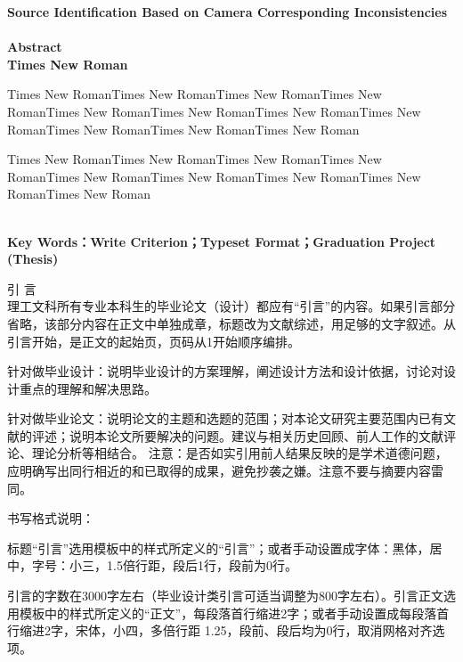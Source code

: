 \documentclass{ctexart}%
\newenvironment{abstract1}[0]{}{}%
{}
\begin{document}
	\begin{abstract1}
	\setmainfont{Times New Roman}  \bfseries \center \linespread{1.25} Source Identification Based on Camera Corresponding Inconsistencies\\
	\heiti {} ~\\
	\setmainfont{Times New Roman}  \center \linespread{1.5} Abstract\\
	\vspace{11pt}
	\setlength{\parindent}{24pt}
	\setmainfont{Times New Roman}  \justifying \linespread{1.25} Times New Roman\par
	Times New RomanTimes New RomanTimes New RomanTimes New RomanTimes New RomanTimes New RomanTimes New RomanTimes New RomanTimes New RomanTimes New RomanTimes New Roman\par 
	Times New RomanTimes New RomanTimes New RomanTimes New RomanTimes New RomanTimes New RomanTimes New RomanTimes New RomanTimes New Roman\par 
	~\\
	\setmainfont{Times New Roman}  \bfseries \justifying  Key Words：Write Criterion；Typeset Format；Graduation Project (Thesis)
	\end{abstract1}
	\clearpage	

	\tableofcontents
	\clearpage

	\setcounter{page}{1}	
	\begin{abstract1}
	\heiti {} \center \linespread{1.5} 引 \qquad 言\\
	\vspace{1ex}
	\songti {} \justifying \linespread{1.25}
	理工文科所有专业本科生的毕业论文（设计）都应有“引言”的内容。如果引言部分省略，该部分内容在正文中单独成章，标题改为文献综述，用足够的文字叙述。从引言开始，是正文的起始页，页码从1开始顺序编排。\par
	针对做毕业设计：说明毕业设计的方案理解，阐述设计方法和设计依据，讨论对设计重点的理解和解决思路。\par
	针对做毕业论文：说明论文的主题和选题的范围；对本论文研究主要范围内已有文献的评述；说明本论文所要解决的问题。建议与相关历史回顾、前人工作的文献评论、理论分析等相结合。
注意：是否如实引用前人结果反映的是学术道德问题，应明确写出同行相近的和已取得的成果，避免抄袭之嫌。注意不要与摘要内容雷同。\par
	书写格式说明：\par
	标题“引言”选用模板中的样式所定义的“引言”；或者手动设置成字体：黑体，居中，字号：小三，1.5倍行距，段后1行，段前为0行。\par
	引言的字数在3000字左右（毕业设计类引言可适当调整为800字左右）。引言正文选用模板中的样式所定义的“正文”，每段落首行缩进2字；或者手动设置成每段落首行缩进2字，宋体，小四，多倍行距 1.25，段前、段后均为0行，取消网格对齐选项。\par
	\end{abstract1}
	\clearpage
	
\end{document}
